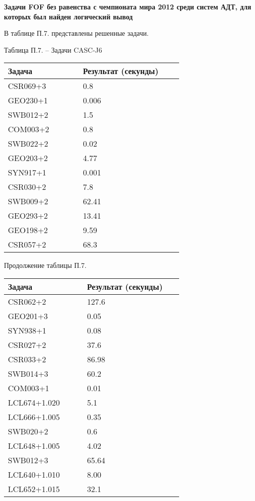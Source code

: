 \textbf{Задачи FOF без равенства с чемпионата мира 2012 среди систем АДТ, для которых был найден логический вывод}

В таблице П.7. представлены решенные задачи.
\begin{center}
Таблица П.7. -- Задачи CASC-J6
\end{center}

\begin{longtable}[H]{|p{0.3\linewidth}|p{0.4\linewidth}|}
\hline
\textbf{Задача} & \textbf{Результат (секунды)} \\
\hline
CSR069+3 & 0.8  \\
\hline
GEO230+1 & 0.006  \\
\hline
SWB012+2 & 1.5  \\
\hline
COM003+2 & 0.8 \\
\hline
SWB022+2 & 0.02 \\
\hline
GEO203+2 & 4.77 \\
\hline
SYN917+1 & 0.001 \\
\hline
CSR030+2 & 7.8 \\
\hline
SWB009+2 & 62.41 \\
\hline
GEO293+2 & 13.41 \\
\hline
GEO198+2 & 9.59 \\
\hline
CSR057+2 & 68.3 \\
\hline
\end{longtable}
\begin{center}
Продолжение таблицы П.7.
\end{center}

\begin{longtable}[H]{|p{0.3\linewidth}|p{0.4\linewidth}|}
\hline
\textbf{Задача} & \textbf{Результат (секунды)} \\
\hline
CSR062+2 & 127.6 \\
\hline
GEO201+3 & 0.05 \\
\hline
SYN938+1 & 0.08 \\
\hline
CSR027+2 & 37.6 \\
\hline
CSR033+2 & 86.98 \\
\hline
SWB014+3 & 60.2 \\
\hline
COM003+1 & 0.01 \\
\hline
LCL674+1.020 & 5.1 \\
\hline
LCL666+1.005 & 0.35 \\
\hline
SWB020+2 & 0.6 \\
\hline
LCL648+1.005 & 4.02 \\
\hline
SWB012+3 & 65.64 \\
\hline
LCL640+1.010 & 8.00 \\
\hline
LCL652+1.015 & 32.1 \\
\hline
\end{longtable}



